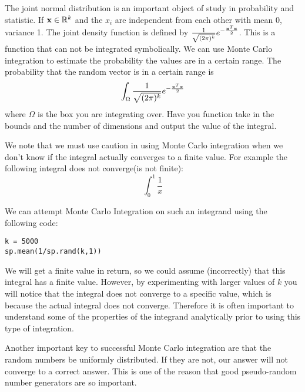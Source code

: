 \begin{problem}
The joint normal distribution is an important object of study in probability and statistic. If $\bold{x} \in \mathbb{R}^k$ and the $x_i$ are independent from each other with mean 0, variance 1. The joint density function is defined by $\frac{1}{\sqrt{(2 \pi)^k}} e^{- \frac{\bold{x}^T\bold{x}}{2}}$.
This is a function that can not be integrated symbolically.
We can use Monte Carlo integration to estimate the probability the values are in a certain range.
The probability that the random vector is in a certain range is
\[
\int_{\Omega} \frac{1}{\sqrt{(2 \pi)^k}} e^{- \frac{\bold{x}^T\bold{x}}{2}}
\]
where $\Omega$ is the box you are integrating over.
Have you function take in the bounds and the number of dimensions and output the value of the integral.

\end{problem}

We note that we must use caution in using Monte Carlo integration when we don't know if the integral actually converges to a finite value. For example the following integral does not converge(is not finite):
\[
\int_0^1 \frac{1}{x}
\]

We can attempt Monte Carlo Integration on such an integrand using the following code:
\begin{lstlisting}
k = 5000
sp.mean(1/sp.rand(k,1))
\end{lstlisting}

We will get a finite value in return, so we could assume (incorrectly) that this integral has a finite value. However, by experimenting with larger values of $k$ you will notice that the integral does not converge to a specific value, which is because the actual integral does not converge. Therefore it is often important to understand some of the properties of the integrand analytically prior to using this type of integration.

Another important key to successful Monte Carlo integration are that the random numbers be uniformly distributed. If they are not, our answer will not converge to a correct answer. This is one of the reason that good pseudo-random number generators are so important.

\begin{comment}
\begin{problem}
\label{prob:mc_flawed}
Create a new function (based upon the function from Problem \ref{prob:mc}) that uses a ``flawed'' random number generator that doesn't produce numbers between $-.95$ and $-1$. Test your method on the function from Problem \ref{prob:mc_test}. How bad is the error? 
\end{problem}
\end{comment}
